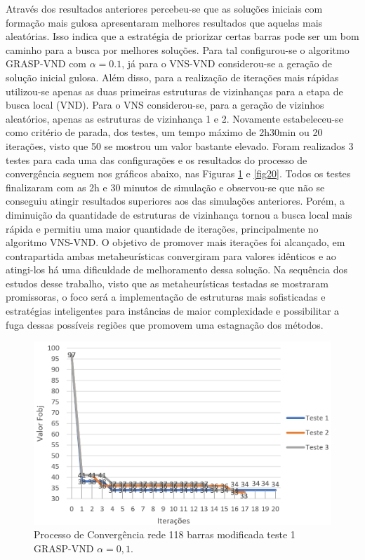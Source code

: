 \documentclass[12pt]{article}
\begin{document}
Através dos resultados anteriores percebeu-se que as soluções iniciais com formação mais gulosa apresentaram melhores resultados que aquelas mais aleatórias. Isso indica que a estratégia de priorizar certas barras pode ser um bom caminho para a busca por melhores soluções. Para tal configurou-se o algoritmo GRASP-VND com $\alpha=0.1$, já para o VNS-VND considerou-se a geração de solução inicial gulosa. Além disso, para a realização de iterações mais rápidas utilizou-se apenas as duas primeiras estruturas de vizinhanças para a etapa de busca local (VND). Para o VNS considerou-se, para a geração de vizinhos aleatórios, apenas as estruturas de vizinhança 1 e 2. Novamente estabeleceu-se como critério de parada, dos testes, um tempo máximo de 2h30min ou 20 iterações, visto que 50 se mostrou um valor bastante elevado. Foram realizados 3 testes para cada uma das configurações e os resultados do processo de convergência seguem nos gráficos abaixo, nas Figuras \ref{fig19} e \ref{fig20}. Todos os testes finalizaram com as 2h e 30 minutos de simulação e observou-se que não se conseguiu atingir resultados superiores aos das simulações anteriores. Porém, a diminuição da quantidade de estruturas de vizinhança tornou a busca local mais rápida e permitiu uma maior quantidade de iterações, principalmente no algoritmo VNS-VND. O objetivo de promover mais iterações foi alcançado, em contrapartida ambas metaheurísticas convergiram para valores idênticos e ao atingi-los há uma dificuldade de melhoramento dessa solução. Na sequência dos estudos desse trabalho, visto que as metaheurísticas testadas se mostraram promissoras, o foco será a implementação de estruturas mais sofisticadas e estratégias inteligentes para instâncias de maior complexidade e possibilitar a fuga dessas possíveis regiões que promovem uma estagnação dos métodos.

\begin{figure}[H]
	\centering 
	\includegraphics[scale=0.8]{figuras/GRASP_118_2_alpha01.jpg}
	\caption{Processo de Convergência rede 118 barras modificada teste 1 GRASP-VND $\alpha=0,1$.}
	\label{fig19} %
\end{figure}
\end{document}

